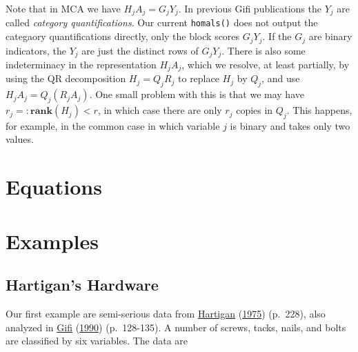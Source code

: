 \documentclass[
  12pt,
]{book}
\begin{document}
Note that in MCA we have \(H_jA_j=G_jY_j\). In previous Gifi publications the \(Y_j\) are called \emph{category quantifications}. Our current \texttt{homals()} does not output the categaory quantifications directly, only the block scores \(G_jY_j\). If the \(G_j\) are binary indicators,
the \(Y_j\) are just the distinct rows of \(G_jY_j\). There is also some indeterminacy in the representation \(H_jA_j\), which we resolve,
at least partially, by using the QR decomposition \(H_j=Q_jR_j\) to replace \(H_j\) by \(Q_j\), and use \(H_jA_j=Q_j(R_jA_j)\). One small problem with this is that we may have \(r_j=:\mathbf{rank}(H_j)<r\), in which case there are only \(r_j\) copies in \(Q_j\). This happens, for example, in the common case in which variable \(j\) is binary and takes only two values.

\hypertarget{equations}{%
\section{Equations}\label{equations}}

\hypertarget{examples}{%
\section{Examples}\label{examples}}

\hypertarget{hartigans-hardware}{%
\subsection{Hartigan's Hardware}\label{hartigans-hardware}}

Our first example are semi-serious data from \protect\hyperlink{ref-hartigan_75}{Hartigan} (\protect\hyperlink{ref-hartigan_75}{1975}) (p.~228), also analyzed in \protect\hyperlink{ref-gifi_B_90}{Gifi} (\protect\hyperlink{ref-gifi_B_90}{1990}) (p.~128-135). A number of screws, tacks, nails, and bolts are classified by six variables. The data are
\end{document}

